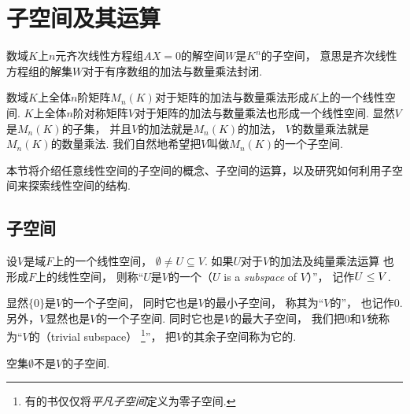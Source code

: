 \section{子空间及其运算}
数域\(K\)上\(n\)元齐次线性方程组\(A X = 0\)的解空间\(W\)是\(K^n\)的子空间，
意思是齐次线性方程组的解集\(W\)对于有序数组的加法与数量乘法封闭.

数域\(K\)上全体\(n\)阶矩阵\(M_n(K)\)对于矩阵的加法与数量乘法形成\(K\)上的一个线性空间.
\(K\)上全体\(n\)阶对称矩阵\(V\)对于矩阵的加法与数量乘法也形成一个线性空间.
显然\(V\)是\(M_n(K)\)的子集，
并且\(V\)的加法就是\(M_n(K)\)的加法，
\(V\)的数量乘法就是\(M_n(K)\)的数量乘法.
我们自然地希望把\(V\)叫做\(M_n(K)\)的一个子空间.

本节将介绍任意线性空间的子空间的概念、子空间的运算，以及研究如何利用子空间来探索线性空间的结构.

\subsection{子空间}
\begin{definition}
设\(V\)是域\(F\)上的一个线性空间，
\(\emptyset\neq U\subseteq V\).
如果\(U\)对于\(V\)的加法及纯量乘法运算
也形成\(F\)上的线性空间，
则称“\(U\)是\(V\)的一个（\(U\) is a \emph{subspace} of \(V\)）”，
记作\(U \leq V\).
\end{definition}

显然\(\{0\}\)是\(V\)的一个子空间，
同时它也是\(V\)的最小子空间，
称其为“\(V\)的”，
也记作\(0\).
另外，\(V\)显然也是\(V\)的一个子空间.
同时它也是\(V\)的最大子空间，
我们把\(0\)和\(V\)统称为“\(V\)的（trivial subspace）
\footnote{
	有的书仅仅将\emph{平凡子空间}定义为零子空间.
}”，
把\(V\)的其余子空间称为它的.

空集\(\emptyset\)不是\(V\)的子空间.

